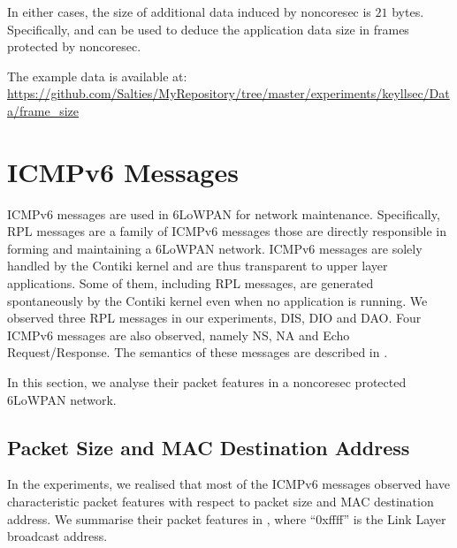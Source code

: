In either cases, the size of additional data induced by noncoresec is $21$ bytes. Specifically,  and  can be used to deduce the application data size in frames protected by noncoresec.

The example data is available at: \\
\url{https://github.com/Salties/MyRepository/tree/master/experiments/keyllsec/Data/frame_size}


\section{ICMPv6 Messages}

ICMPv6 messages are used in 6LoWPAN for network maintenance. Specifically, RPL messages are a family of ICMPv6 messages those are directly responsible in forming and maintaining a 6LoWPAN network. ICMPv6 messages are solely handled by the Contiki kernel and are thus transparent to upper layer applications. Some of them, including RPL messages, are generated spontaneously by the Contiki kernel even when no application is running. We observed three RPL messages in our experiments, DIS, DIO and DAO. Four ICMPv6 messages are also observed, namely NS, NA and Echo Request/Response. The semantics of these messages are described in .

In this section, we analyse their packet features in a noncoresec protected 6LoWPAN network.

\subsection{Packet Size and MAC Destination Address} \label{Size and Dst of ICMP}

In the experiments, we realised that most of the ICMPv6 messages observed have characteristic packet features with respect to packet size and MAC destination address. We summarise their packet features in , where ``0xffff'' is the Link Layer broadcast address.

